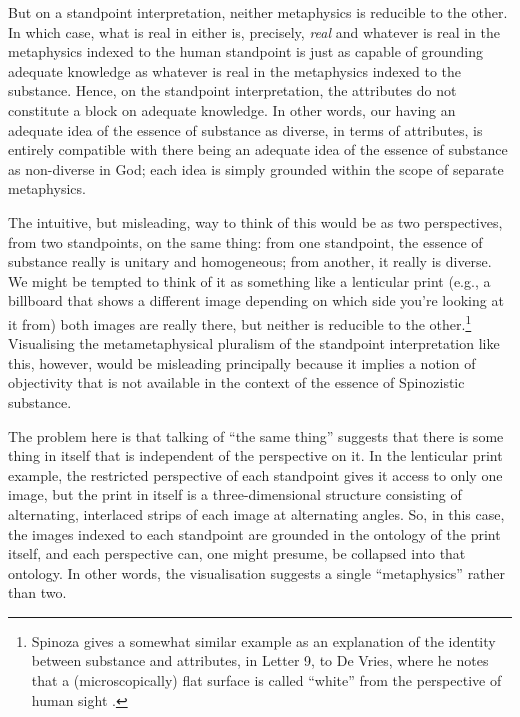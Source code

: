 \documentclass[11pt]{article}
\newcommand{\dash}{\unskip{---}}
\begin{document}
	But on a standpoint interpretation, neither metaphysics is reducible to the other. In which case, what is real in either is, precisely, \emph{real} \dash and whatever is real in the metaphysics indexed to the human standpoint is just as capable of grounding adequate knowledge as whatever is real in the metaphysics indexed to the substance. Hence, on the standpoint interpretation, the attributes do not constitute a block on adequate knowledge. In other words, our having an adequate idea of the essence of substance as diverse, in terms of attributes, is entirely compatible with there being an adequate idea of the essence of substance as non-diverse in God; each idea is simply grounded within the scope of separate metaphysics.
	
	The intuitive, but misleading, way to think of this would be as two perspectives, from two standpoints, on the same thing: from one standpoint, the essence of substance really is unitary and homogeneous; from another, it really is diverse. We might be tempted to think of it as something like a lenticular print (e.g., a billboard that shows a different image depending on which side you're looking at it from) \dash both images are really there, but neither is reducible to the other.\footnote{Spinoza gives a somewhat similar example as an explanation of the identity between substance and attributes, in Letter 9, to De Vries, where he notes that a (microscopically) flat surface is called \enquote{white} from the perspective of human sight \autocite[195--196]{C1}.} Visualising the metametaphysical pluralism of the standpoint interpretation like this, however, would be misleading principally because it implies a notion of objectivity that is not available in the context of the essence of Spinozistic substance.
		
	The problem here is that talking of \enquote{the same thing} suggests that there is some thing in itself that is independent of the perspective on it. In the lenticular print example, the restricted perspective of each standpoint gives it access to only one image, but the print in itself is a three-dimensional structure consisting of alternating, interlaced strips of each image at alternating angles. So, in this case, the images indexed to each standpoint are grounded in the ontology of the print itself, and each perspective can, one might presume, be collapsed into that ontology. In other words, the visualisation suggests a single \enquote{metaphysics} rather than two.
	
\end{document}
